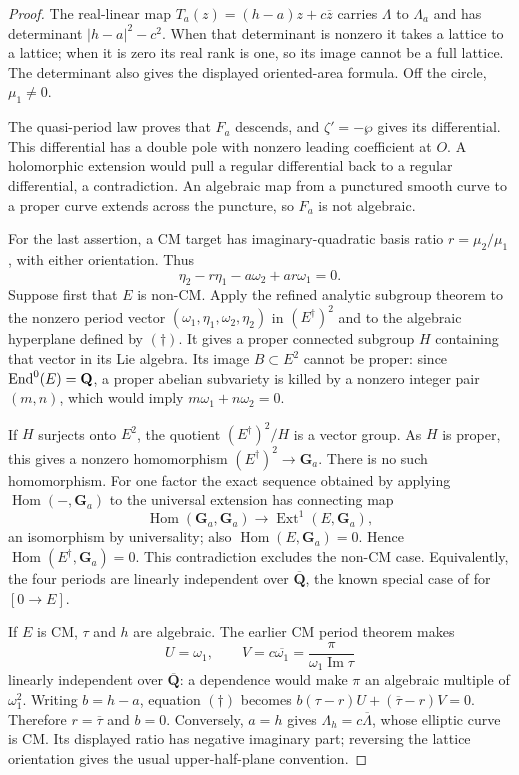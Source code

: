 \documentclass[11pt]{article}
\theoremstyle{definition}\newtheorem{definition}[theorem]{Definition}
\theoremstyle{remark}\newtheorem{remark}[theorem]{Remark}
\newcommand{\Q}{\mathbf Q}\newcommand{\Z}{\mathbf Z}
\newcommand{\Qb}{\overline{\mathbf Q}}\newcommand{\Fp}{\mathbf F_p}
\begin{document}
\begin{proof}
The real-linear map $T_a(z)=(h-a)z+c\overline z$ carries $\Lambda$ to $\Lambda_a$ and has determinant $|h-a|^2-c^2$. When that determinant is nonzero it takes a lattice to a lattice; when it is zero its real rank is one, so its image cannot be a full lattice. The determinant also gives the displayed oriented-area formula. Off the circle, $\mu_1\ne0$.

The quasi-period law proves that $F_a$ descends, and $\zeta'=-\wp$ gives its differential. This differential has a double pole with nonzero leading coefficient at $O$. A holomorphic extension would pull a regular differential back to a regular differential, a contradiction. An algebraic map from a punctured smooth curve to a proper curve extends across the puncture, so $F_a$ is not algebraic.

For the last assertion, a CM target has imaginary-quadratic basis ratio $r=\mu_2/\mu_1$, with either orientation. Thus
\[
                \eta_2-r\eta_1-a\omega_2+ar\omega_1=0.       \tag{$\dagger$}
\]
Suppose first that $E$ is non-CM. Apply the refined analytic subgroup theorem to the nonzero period vector
$(\omega_1,\eta_1,\omega_2,\eta_2)$ in $(E^\dagger)^2$ and to the algebraic hyperplane defined by $(\dagger)$. It gives a proper connected subgroup $H$ containing that vector in its Lie algebra. Its image $B\subset E^2$ cannot be proper: since $\End^0(E)=\Q$, a proper abelian subvariety is killed by a nonzero integer pair $(m,n)$, which would imply $m\omega_1+n\omega_2=0$.

If $H$ surjects onto $E^2$, the quotient $(E^\dagger)^2/H$ is a vector group. As $H$ is proper, this gives a nonzero homomorphism $(E^\dagger)^2\to\mathbf G_a$. There is no such homomorphism. For one factor the exact sequence obtained by applying $\operatorname{Hom}(-,\mathbf G_a)$ to the universal extension has connecting map
\[
 \operatorname{Hom}(\mathbf G_a,\mathbf G_a)
          \longrightarrow\operatorname{Ext}^1(E,\mathbf G_a),
\]
an isomorphism by universality; also $\operatorname{Hom}(E,\mathbf G_a)=0$. Hence $\operatorname{Hom}(E^\dagger,\mathbf G_a)=0$. This contradiction excludes the non-CM case. Equivalently, the four periods are linearly independent over $\Qb$, the known special case of \cite[Definition 15.1 and Lemma 15.6, printed pp.~133, 136--138]{HuberWustholz} for $[0\to E]$.

If $E$ is CM, $\tau$ and $h$ are algebraic. The earlier CM period theorem makes
\[
 U=\omega_1,\qquad V=c\overline{\omega_1}
                      =\frac{\pi}{\omega_1\operatorname{Im}\tau}
\]
linearly independent over $\Qb$: a dependence would make $\pi$ an algebraic multiple of $\omega_1^2$. Writing $b=h-a$, equation $(\dagger)$ becomes
$b(\tau-r)U+(\overline\tau-r)V=0$. Therefore $r=\overline\tau$ and $b=0$. Conversely, $a=h$ gives $\Lambda_h=c\overline\Lambda$, whose elliptic curve is CM. Its displayed ratio has negative imaginary part; reversing the lattice orientation gives the usual upper-half-plane convention.
\end{proof}
\end{document}
